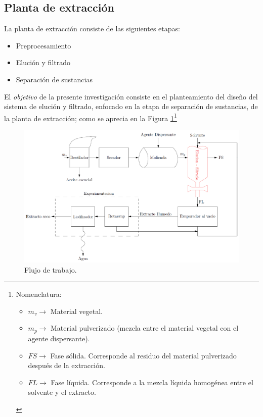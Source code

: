 \begin{center}
	\section{Planta de extracci\'on}
\end{center}

\noindent
\justify

La planta de extracci\'on consiste de las siguientes etapas:

\begin{itemize}
	\item Preprocesamiento
	\item Eluci\'on y filtrado
	\item Separaci\'on de sustancias
\end{itemize}

\noindent
\justify

El \textit{objetivo} de la presente investigaci\'on consiste en el planteamiento del dise\~no del sistema de eluci\'on y filtrado, enfocado en la etapa de separaci\'on de sustancias, de la planta de extracci\'on; como se aprecia en la Figura \ref{biofabrica}\footnote{Nomenclatura:
\begin{itemize}
	\item $m_v \rightarrow $ Material vegetal.
	\item $m_p \rightarrow $ Material pulverizado (mezcla entre el material vegetal con el agente dispersante).
	\item $FS \rightarrow $ Fase s\'olida. Corresponde al residuo del material pulverizado despu\'es de la extracci\'on.
	\item $FL \rightarrow $ Fase l\'iquida. Corresponde a la mezcla l\'iquida homog\'enea entre el solvente y el extracto.
\end{itemize}}

\begin{figure}[h!]
	\centering
	\includegraphics[width=\textwidth]{Images/planta.PNG}
	\caption{Flujo de trabajo.}
	\label{biofabrica}
\end{figure}


